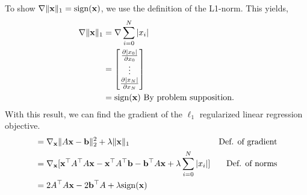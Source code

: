 \documentclass[12pt,letterpaper,fleqn]{hmcpset}
\begin{document}
\begin{solution}
    To show $\nabla \|{\bf x}\|_1 = \mathrm{sign}({\bf x})$, we use the definition of the L1-norm. This yields,
    \begin{align*}
        \nabla \|{\bf x}\|_1 &= \nabla \sum_{i=0}^N |x_i|\\
        &= \begin{bmatrix} \frac{\partial |x_0|}{\partial x_0}\\\vdots\\\frac{\partial|x_N|}{\partial x_N} \end{bmatrix}\\
        &= \mathrm{sign}({\bf x}) \text{ By problem supposition.}
    \end{align*}
    With this result, we can find the gradient of the $\ell_1$ regularized linear regression objective. 
    \begin{align*}
        &= \nabla_{{\bf x}} \|A{\bf x} - {\bf b}\|_2^2 + \lambda \|{\bf x}\|_1 & \text{Def. of gradient}\\
        &= \nabla_{{\bf x}} [{\bf x}^\top A^\top A {\bf x} - {\bf x}^\top A^\top {\bf b} - {\bf b}^\top A {\bf x} + \lambda \sum_{i=0}^N |x_i| ]   & \text{Def. of norms}\\
        &= 2 A^\top A {\bf x} - 2 {\bf b}^\top A + \lambda \mathrm{sign}({\bf x}) & \\
    \end{align*}


\end{solution}
\end{document}
